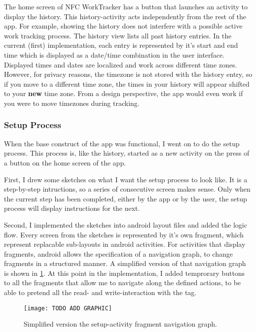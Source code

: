 \documentclass[conference]{IEEEtran}
\newcommand{\projectname}{NFC WorkTracker}
\begin{document}
The home screen of \projectname{} has a button that launches an activity to display the history. This history-activity acts independently from the rest of the app. For example, showing the history does not interfere with a possible active work tracking process. The history view lists all past history entries. In the current (first) implementation, each entry is represented by it's start and end time which is displayed as a date/time combination in the user interface. Displayed times and dates are localized and work across different time zones. However, for privacy reasons, the timezone is not stored with the history entry, so if you move to a different time zone, the times in your history will appear shifted to your \textbf{new} time zone. From a design perspective, the app would even work if you were to move timezones during tracking.

\subsubsection{Setup Process}
When the base construct of the app was functional, I went on to do the setup process. This process is, like the history, started as a new activity on the press of a button on the home screen of the app.

First, I drew some sketches on what I want the setup process to look like. It is a step-by-step intructions, so a series of consecutive screen makes sense. Only when the current step has been completed, either by the app or by the user, the setup process will display instructions for the next.

Second, I implemented the sketches into android layout files and added the logic flow. Every screen from the sketches is represented by it's own fragment, which represent replacable sub-layouts in android activities. For activities that display fragments, android allows the specification of a navigation graph, to change fragments in a structured manner. A simplified version of that navigation graph is shown in \cref{fig:nav-graph}. At this point in the implementation, I added temprorary buttons to all the fragments that allow me to navigate along the defined actions, to be able to pretend all the read- and write-interaction with the tag.

\begin{figure}
	\centering
	\texttt{[image: TODO ADD GRAPHIC]}
	\caption{Simplified version the setup-activity fragment navigation graph.}
	\label{fig:nav-graph}
\end{figure}
\end{document}
